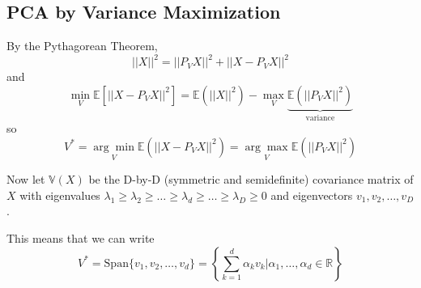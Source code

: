 \documentclass[12pt]{article}
\newcommand{\R}{\mathbb{R}}
\newcommand{\E}{\mathbb{E}}
\newcommand{\abs}[1]{\left\vert #1 \right\vert}
\begin{document}
    \subsection{PCA by Variance Maximization}
        \begin{center}
        \end{center}

        By the Pythagorean Theorem,
        \[\abs{\abs{X}}^2 = \abs{\abs{P_VX}}^2 + \abs{\abs{X - P_VX}}^2\]
        and 
        \[\min_V \E[\abs{\abs{X - P_VX}}^2] = \E(\abs{\abs{X}}^2) - \max_V \underbrace{\E(\abs{\abs{P_VX}}^2)}_{\text{variance}}\]
        so 
        \[V^* = \underset{V}{\arg\min} \E(\abs{\abs{X - P_VX}}^2) = \underset{V}{\arg\max} \E(\abs{\abs{P_VX}}^2)\]

        Now let $\mathbb{V}(X)$ be the D-by-D (symmetric and semidefinite) covariance matrix of $X$ with eigenvalues $\lambda_1 \geq \lambda_2 \geq \dots \geq \lambda_d \geq \dots \geq \lambda_D \geq 0$ and eigenvectors $v_1, v_2, \dots, v_D$.

        This means that we can write 
        \[V^* = \text{Span}\{v_1, v_2, \dots, v_d\} = \left\{\sum_{k=1}^d \alpha_k v_k \big\vert \alpha_1, \dots, \alpha_d \in \R\right\}\]
\end{document}
